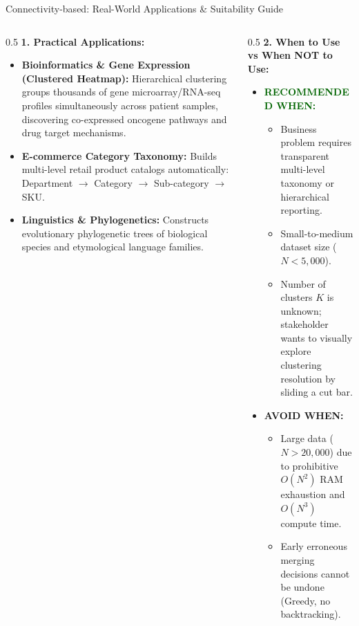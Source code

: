 \documentclass[aspectratio=169,10pt]{beamer}
\begin{document}
\begin{frame}{Connectivity-based: Real-World Applications \& Suitability Guide}
  \footnotesize
  \begin{columns}[T]
    \begin{column}{0.5\textwidth}
      \textbf{1. Practical Applications:}
      \begin{itemize}\setlength{\itemsep}{2pt}
        \item \textbf{Bioinformatics \& Gene Expression (Clustered Heatmap):}
          Hierarchical clustering groups thousands of gene microarray/RNA-seq profiles simultaneously across patient samples, discovering co-expressed oncogene pathways and drug target mechanisms.
        \item \textbf{E-commerce Category Taxonomy:}
          Builds multi-level retail product catalogs automatically: Department $\to$ Category $\to$ Sub-category $\to$ SKU.
        \item \textbf{Linguistics \& Phylogenetics:}
          Constructs evolutionary phylogenetic trees of biological species and etymological language families.
      \end{itemize}
    \end{column}
    \begin{column}{0.5\textwidth}
      \textbf{2. When to Use vs When NOT to Use:}
      \begin{itemize}\setlength{\itemsep}{2pt}
        \item \textcolor{darkgreen}{\textbf{RECOMMENDED WHEN:}}
          \begin{itemize}
            \item Business problem requires transparent multi-level taxonomy or hierarchical reporting.
            \item Small-to-medium dataset size ($N < 5{,}000$).
            \item Number of clusters $K$ is unknown; stakeholder wants to visually explore clustering resolution by sliding a cut bar.
          \end{itemize}
        \item \textcolor{crimsonred}{\textbf{AVOID WHEN:}}
          \begin{itemize}
            \item Large data ($N > 20{,}000$) due to prohibitive $O(N^2)$ RAM exhaustion and $O(N^3)$ compute time.
            \item Early erroneous merging decisions cannot be undone (Greedy, no backtracking).
          \end{itemize}
      \end{itemize}
    \end{column}
  \end{columns}
\end{frame}
\end{document}
